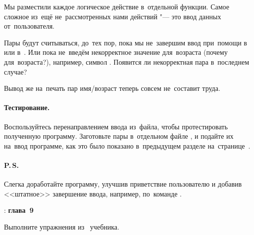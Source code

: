 
Мы разместили каждое логическое действие в~отдельной функции. Самое сложное из~ещё не~рассмотренных нами действий "--- это ввод данных от~пользователя.


Пары будут считываться, до~тех пор, пока мы не~завершим ввод при~помощи  в~ или  в~. Или пока не~введём некорректное значение для~возраста (почему для~возраста?), например, символ . Появится ли некорректная пара в~последнем случае?

Вывод же на~печать пар имя/возраст теперь совсем не~составит труда.




\paragraph{Тестирование.}
Воспользуйтесь перенаправлением ввода из~файла, чтобы протестировать полученную программу. Заготовьте пары в~отдельном файле , и подайте их на~ввод программе, как это было показано в~предыдущем разделе на~странице~\pageref{par:inout}.



\paragraph{P.\,S.}
Слегка доработайте программу, улучшив приветствие пользователю и добавив <<штатное>> завершение ввода, например, по~команде .



\WhatToReadSection
\textcite{Stroustrup:2016:ru}: \textbf{глава~9}



\ExercisesSection
\begin{exercise}
\item Выполните упражнения из~ учебника.

\end{exercise}
